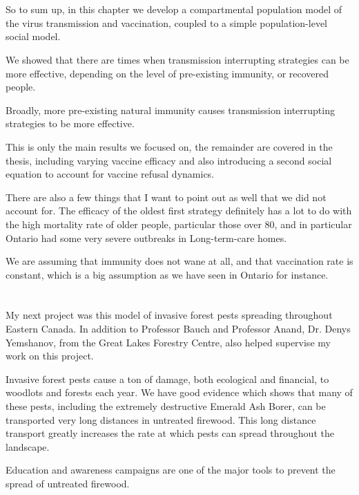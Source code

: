 \documentclass{article}
\begin{document}
\section{}

So to sum up, in this chapter we develop a compartmental population model of the virus transmission and vaccination, coupled to a simple population-level social model. 


We showed that there are times when transmission interrupting strategies can be more effective, depending on the level of pre-existing immunity, or recovered people. 

Broadly, more pre-existing natural immunity causes transmission interrupting strategies to be more effective.

This is only the main results we focused on, the remainder are covered in the thesis, including varying vaccine efficacy and also introducing a second social equation to account for vaccine refusal dynamics.

There are also a few things that I want to point out as well that we did not account for. The efficacy of the oldest first strategy definitely has a lot to do with the high mortality rate of older people, particular those over 80, and in particular Ontario had some very severe outbreaks in Long-term-care homes.

We are assuming that immunity does not wane at all, and that vaccination rate is constant, which is a big assumption as we have seen in Ontario for instance.



\section{}

My next project was this model of invasive forest pests spreading throughout Eastern Canada. In addition to Professor Bauch and Professor Anand, Dr. Denys Yemshanov, from the Great Lakes Forestry Centre, also helped supervise my work on this project. 

Invasive forest pests cause a ton of damage, both ecological and financial, to woodlots and forests each year. We have good evidence which shows that many of these pests, including the extremely destructive Emerald Ash Borer, can be transported very long distances in untreated firewood. This long distance transport greatly increases the rate at which pests can spread throughout the landscape.

Education and awareness campaigns are one of the major tools to prevent the spread of untreated firewood. 
\end{document}

